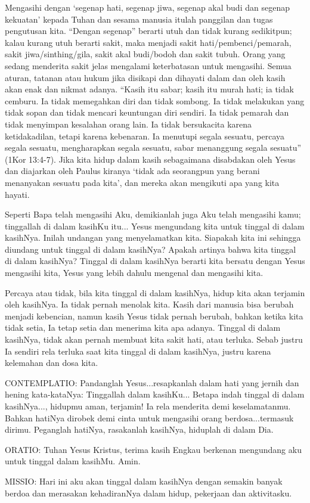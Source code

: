 \documentclass[12pt,a4paper,twoside]{article}
\begin{document}
Mengasihi dengan ‘segenap hati, segenap jiwa, segenap akal budi dan segenap kekuatan’  kepada Tuhan dan sesama manusia itulah panggilan dan tugas pengutusan kita. “Dengan segenap”  berarti utuh dan tidak kurang sedikitpun; kalau kurang utuh berarti sakit, maka menjadi sakit hati/pembenci/pemarah, sakit jiwa/sinthing/gila, sakit akal budi/bodoh dan sakit tubuh. Orang yang sedang menderita sakit jelas mengalami keterbatasan untuk mengasihi. Semua aturan, tatanan atau hukum jika disikapi dan dihayati dalam dan oleh kasih akan enak dan nikmat adanya. “Kasih itu sabar; kasih itu murah hati; ia tidak cemburu. Ia tidak memegahkan diri dan tidak sombong. Ia tidak melakukan yang tidak sopan dan tidak mencari keuntungan diri sendiri. Ia tidak pemarah dan tidak menyimpan kesalahan orang lain. Ia tidak bersukacita karena ketidakadilan, tetapi karena kebenaran. Ia menutupi segala sesuatu, percaya segala sesuatu, mengharapkan segala sesuatu, sabar menanggung segala sesuatu” (1Kor 13:4-7). Jika kita hidup dalam kasih sebagaimana disabdakan oleh Yesus dan diajarkan oleh Paulus kiranya ‘tidak ada seorangpun yang berani menanyakan sesuatu pada kita’, dan mereka akan mengikuti apa yang kita hayati.

      Seperti Bapa telah mengasihi Aku, demikianlah juga Aku telah mengasihi
kamu; tinggallah di dalam kasihKu itu... Yesus mengundang kita untuk tinggal
di dalam kasihNya. Inilah undangan yang menyelamatkan kita. Siapakah kita
ini sehingga diundang untuk tinggal di dalam kasihNya? Apakah artinya bahwa
kita tinggal di dalam kasihNya? Tinggal di dalam kasihNya berarti kita
bersatu dengan Yesus mengasihi kita, Yesus yang lebih dahulu mengenal dan
mengasihi kita.

       Percaya atau tidak, bila kita tinggal di dalam kasihNya, hidup kita
akan terjamin oleh kasihNya. Ia tidak pernah menolak kita. Kasih dari
manusia bisa berubah menjadi kebencian, namun kasih Yesus tidak pernah
berubah, bahkan ketika kita tidak setia, Ia tetap setia dan menerima kita
apa adanya. Tinggal di dalam kasihNya, tidak akan pernah membuat kita sakit
hati, atau terluka. Sebab justru Ia sendiri rela terluka saat kita tinggal
di dalam kasihNya, justru karena kelemahan dan dosa kita.

CONTEMPLATIO:
Pandanglah Yesus...resapkanlah dalam hati yang jernih dan hening
kata-kataNya: Tinggallah dalam kasihKu... Betapa indah tinggal di dalam
kasihNya..., hidupmu aman, terjamin! Ia rela menderita demi keselamatanmu.
Bahkan hatiNya dirobek demi cinta untuk mengasihi orang berdosa...termasuk
dirimu. Peganglah hatiNya, rasakanlah kasihNya, hiduplah di dalam Dia.

ORATIO:
Tuhan Yesus Kristus, terima kasih Engkau berkenan mengundang aku untuk
tinggal dalam kasihMu. Amin.

MISSIO:
Hari ini aku akan tinggal dalam kasihNya dengan semakin banyak berdoa dan
merasakan kehadiranNya dalam hidup, pekerjaan dan aktivitasku.
\end{document}
